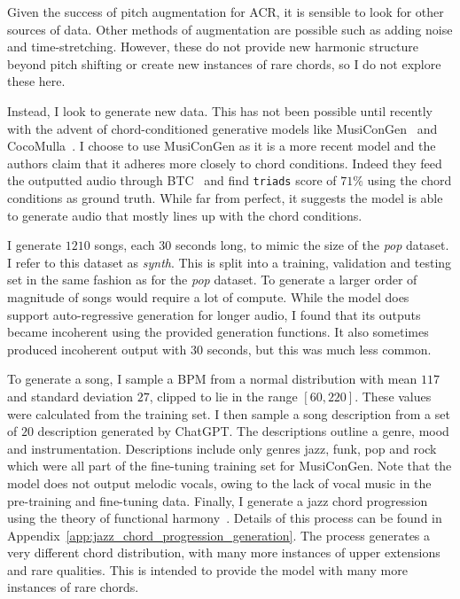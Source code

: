 Given the success of pitch augmentation for ACR, it is sensible to look for other sources of data. Other methods of augmentation are possible such as adding noise and time-stretching. However, these do not provide new harmonic structure beyond pitch shifting or create new instances of rare chords, so I do not explore these here.

Instead, I look to generate new data. This has not been possible until recently with the advent of chord-conditioned generative models like MusiConGen~\citep{MusiConGen} and CocoMulla~\citep{CocoMulla}. I choose to use MusiConGen as it is a more recent model and the authors claim that it adheres more closely to chord conditions. Indeed they feed the outputted audio through BTC~\citep{BTC} and find \texttt{triads} score of $71\%$ using the chord conditions as ground truth. While far from perfect, it suggests the model is able to generate audio that mostly lines up with the chord conditions.

I generate $1210$ songs, each $30$ seconds long, to mimic the size of the \emph{pop} dataset. I refer to this dataset as \emph{synth}. This is split into a training, validation and testing set in the same fashion as for the \emph{pop} dataset. To generate a larger order of magnitude of songs would require a lot of compute. While the model does support auto-regressive generation for longer audio, I found that its outputs became incoherent using the provided generation functions. It also sometimes produced incoherent output with $30$ seconds, but this was much less common.

To generate a song, I sample a BPM from a normal distribution with mean $117$ and standard deviation $27$, clipped to lie in the range $[60,220]$. These values were calculated from the training set. I then sample a song description from a set of $20$ description generated by ChatGPT. The descriptions outline a genre, mood and instrumentation. Descriptions include only genres jazz, funk, pop and rock which were all part of the fine-tuning training set for MusiConGen. Note that the model does not output melodic vocals, owing to the lack of vocal music in the pre-training and fine-tuning data. Finally, I generate a jazz chord progression using the theory of functional harmony~\citet{GenerativeGrammarJazz}. Details of this process can be found in Appendix~\ref{app:jazz_chord_progression_generation}. The process generates a very different chord distribution, with many more instances of upper extensions and rare qualities. This is intended to provide the model with many more instances of rare chords. 

